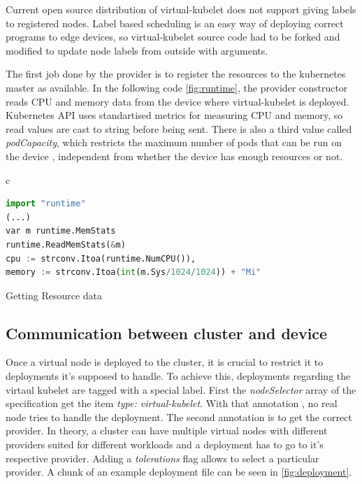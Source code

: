 Current open source distribution of virtual-kubelet does not support giving labels to registered nodes. Label based scheduling is an easy way of deploying correct programs to edge devices, so virtual-kubelet source code had to be forked and modified to update node labels from outside with arguments.

The first job done by the provider is to register the resources to the kubernetes master as available. In the following code \ref{fig:runtime}, the provider constructor reads CPU and memory data from the device where virtual-kubelet is deployed. Kubernetes API uses standartised metrics for measuring CPU and memory, so read values are cast to string before being sent. There is also a third value called \textit{podCapacity}, which restricts the maximum number of pods that can be run on the device , independent from whether the device has enough resources or not.
\begin{code}[htpb]
  \centering
  \begin{tabular}{c}
  \begin{lstlisting}[language=python]
import "runtime"
(...)
var m runtime.MemStats
runtime.ReadMemStats(&m)
cpu := strconv.Itoa(runtime.NumCPU()),
memory := strconv.Itoa(int(m.Sys/1024/1024)) + "Mi"

\end{lstlisting}
\end{tabular}
\caption{Getting Resource data}\label{fig:runtime}
\end{code}

\subsection{Communication between cluster and device}
Once a virtual node is deployed to the cluster, it is crucial to restrict it to deployments it's supposed to handle. To achieve this, deployments regarding the virtaul kubelet are tagged with a special label. First the \textit{nodeSelector} array of the specification get the item \textit{type: virtual-kubelet}. With that annotation , no real node tries to handle the deployment. The second annotation is to get the correct provider. In theory, a cluster can have multiple virtual nodes with different providers suited for different workloads and a deployment has to go to it's respective provider. Adding a \textit{tolerations} flag allows to select a particular provider. A chunk of an example deployment file can be seen in \ref{fig:deployment}.

